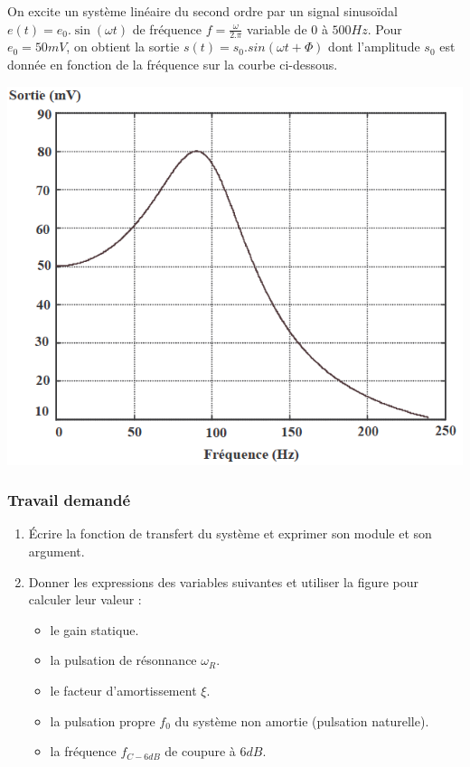 
On excite un système linéaire du second ordre par un signal sinusoïdal $e(t)=e_0.\sin(\omega t)$ de fréquence $f=\frac{\omega}{2.\pi}$ variable de $0$ à $500Hz$. Pour $e_0=50mV$, on obtient la sortie $s(t)=s_0.sin(\omega t +\Phi)$ dont l'amplitude $s_0$ est donnée en fonction de la fréquence sur la courbe ci-dessous.

\begin{center}
\includegraphics[scale=0.5]{png/graphe2nd.png}
\end{center}

\subsubsection{Travail demandé}
\begin{enumerate}
\item Écrire la fonction de transfert du système et exprimer son module et son argument.
\item Donner les expressions des variables suivantes et utiliser la figure pour calculer leur valeur :
\begin{itemize}
\item le gain statique.
\item la pulsation de résonnance $\omega_R$.
\item le facteur d'amortissement $\xi$.
\item la pulsation propre $f_0$ du système non amortie (pulsation naturelle).
\item la fréquence $f_{C-6dB}$ de coupure à $6dB$.
\end{itemize}
\end{enumerate}

